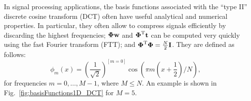 \documentclass[10pt,twoside]{book}
\begin{document}
%
In signal processing applications, the basis functions associated with the ``type II'' discrete cosine transform (DCT) often have useful analytical and numerical properties.
In particular, they often allow to compress signals efficiently by discarding the highest frequencies; ${\mbox{\boldmath {${\Phi}$}}} \mathbf{w}$ and ${\mbox{\boldmath {${\Phi}$}}}^\mathrm{T} \mathbf{t}$ can be computed very quickly using the fast Fourier transform (FTT); and ${\mbox{\boldmath {${\Phi}$}}}^\mathrm{T}{\mbox{\boldmath {${\Phi}$}}} = \frac{N}{2} \mathbf{I}$.
%
They are defined as follows:
\begin{equation}
\phi_m( x ) 
= 
\left( 
  \frac{1}{\sqrt{2}} \right)^{[m=0]}
  \cos\left( \pi m ( x + \frac{1}{2} ) / N 
\right)
\label{eq:DCTbasisFunctions}
,
\end{equation}
for frequencies $m=0, \ldots, M-1$, where $M \leq N$.
%
%
An example is shown in Fig.~\ref{fig:basisFunctions1D_DCT} for $M=5$. 
\end{document}
